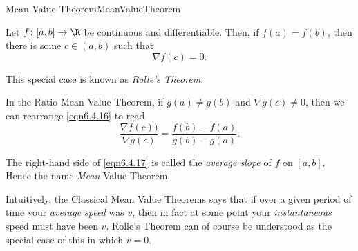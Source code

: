 \begin{thm}{Mean Value Theorem}{MeanValueTheorem}
\begin{rmk}
Let $f\colon [a,b]\rightarrow \R$ be continuous and differentiable.  Then, if $f(a)=f(b)$, then there is some $c\in (a,b)$ such that
\begin{equation}
\nabla f(c)=0.
\end{equation}

This special case is known as \emph{Rolle's Theorem}.
\end{rmk}
\begin{rmk}
In the Ratio Mean Value Theorem, if $g(a)\neq g(b)$ and $\nabla g(c)\neq 0$, then we can rearrange \eqref{eqn6.4.16} to read
\begin{equation}
\frac{\nabla f(c))}{\nabla g(c)}=\frac{f(b)-f(a)}{g(b)-g(a)}.
\end{equation}
\end{rmk}
\begin{rmk}
The right-hand side of \eqref{eqn6.4.17} is called the \emph{average slope} of $f$ on $[a,b]$.  Hence the name \emph{Mean} Value Theorem.
\end{rmk}
\begin{rmk}
Intuitively, the Classical Mean Value Theorems says that if over a given period of time your \emph{average speed} was $v$, then in fact at some point your \emph{instantaneous} speed must have been $v$.  Rolle's Theorem can of course be understood as the special case of this in which $v=0$.


\end{rmk}
\end{thm}
